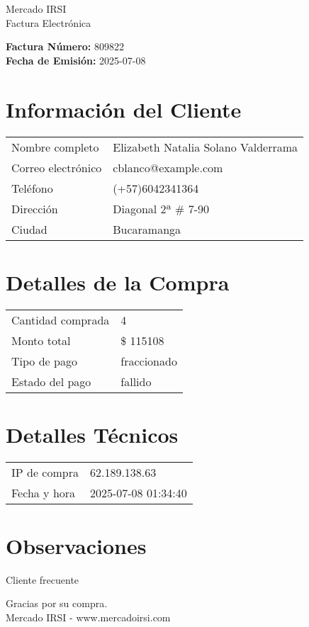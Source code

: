 \documentclass[12pt]{article}
\begin{document}
\begin{center}
    \Huge Mercado IRSI \\
    \Large Factura Electrónica
\end{center}

\vspace{0.5cm}

\noindent \textbf{Factura Número:} 809822 \\
\textbf{Fecha de Emisión:} 2025-07-08

\vspace{0.5cm}

\section*{Información del Cliente}
\begin{longtable}{ll}
Nombre completo & Elizabeth Natalia Solano Valderrama \\
Correo electrónico & cblanco@example.com \\
Teléfono & (+57)6042341364 \\
Dirección & Diagonal 2ª \# 7-90 \\
Ciudad & Bucaramanga \\
\end{longtable}

\vspace{0.5cm}

\section*{Detalles de la Compra}
\begin{longtable}{ll}
Cantidad comprada & 4 \\
Monto total & \$ 115108 \\
Tipo de pago & fraccionado \\
Estado del pago & fallido \\
\end{longtable}

\vspace{0.5cm}

\section*{Detalles Técnicos}
\begin{longtable}{ll}
IP de compra & 62.189.138.63 \\
Fecha y hora & 2025-07-08 01:34:40 \\
\end{longtable}

\vspace{0.5cm}

\section*{Observaciones}
Cliente frecuente

\vspace{0.5cm}

\begin{center}
    Gracias por su compra. \\
    Mercado IRSI - www.mercadoirsi.com
\end{center}
\end{document}
